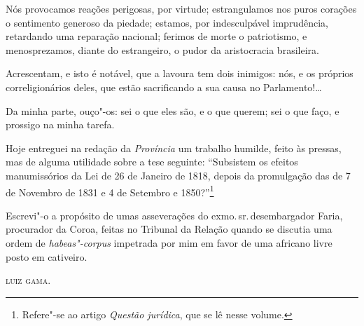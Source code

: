 Nós provocamos reações perigosas, por virtude; estrangulamos nos puros
corações o sentimento generoso da piedade; estamos, por indesculpável
imprudência, retardando uma reparação nacional; ferimos de morte o
patriotismo, e menosprezamos, diante do estrangeiro, o pudor da
aristocracia brasileira.

Acrescentam, e isto é notável, que a lavoura tem dois inimigos: nós, e
os próprios correligionários deles, que estão sacrificando a sua causa
no Parlamento!\ldots{}

Da minha parte, ouço"-os: sei o que eles são, e o que querem; sei o que
faço, e prossigo na minha tarefa.

Hoje entreguei na redação da \emph{Província} um trabalho humilde, feito
às pressas, mas de alguma utilidade sobre a tese seguinte: ``Subsistem os
efeitos manumissórios da Lei de 26 de Janeiro de 1818, depois da
promulgação das de 7 de Novembro de 1831 e 4 de Setembro e
1850?''\footnote{Refere"-se ao artigo \emph{Questão jurídica}, que se lê
  nesse volume.}

Escrevi"-o a propósito de
umas asseverações do exmo.\,sr.\,desembargador Faria, procurador da Coroa,
feitas no Tribunal da Relação quando se discutia uma ordem de
\emph{habeas"-corpus} impetrada por mim em favor de uma africano livre
posto em cativeiro.

\medskip

\hfill\textsc{luiz gama.}

\pagebreak
\mbox{}\vfill
\thispagestyle{empty}

